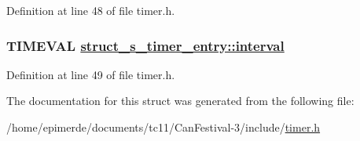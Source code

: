 Definition at line 48 of file timer.h.\hypertarget{structstruct__s__timer__entry_472c7adbaa1bd11813ab888ae328c61c}{
\subsubsection[interval]{\setlength{\rightskip}{0pt plus 5cm}TIMEVAL \hyperlink{structstruct__s__timer__entry_472c7adbaa1bd11813ab888ae328c61c}{struct\_\-s\_\-timer\_\-entry::interval}}}
\label{structstruct__s__timer__entry_472c7adbaa1bd11813ab888ae328c61c}




Definition at line 49 of file timer.h.

The documentation for this struct was generated from the following file:\begin{CompactItemize}
\item 
/home/epimerde/documents/tc11/Can\-Festival-3/include/\hyperlink{timer_8h}{timer.h}\end{CompactItemize}
